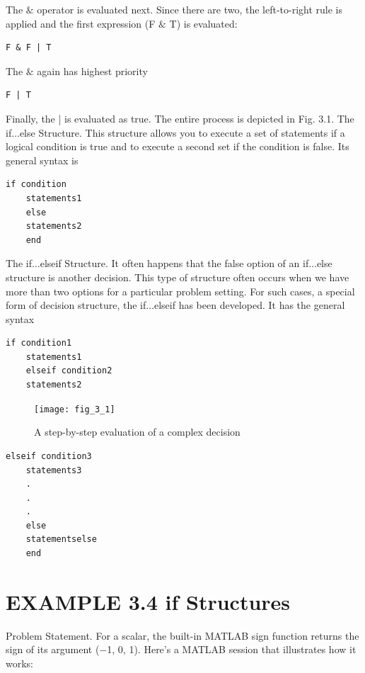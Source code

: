 \documentclass[../main.tex]{subfiles}
\begin{document}
The $\&$ operator is evaluated next. Since there are two, the left-to-right rule is applied and
the first expression (F $\&$ T) is evaluated:
\begin{lstlisting}[frame=none, numbers=none]
    F & F | T
\end{lstlisting}

The $\&$ again has highest priority
\begin{lstlisting}[frame=none, numbers=none]
    F | T
\end{lstlisting}

Finally, the | is evaluated as true. The entire process is depicted in Fig. 3.1.
The if$\ldots$else Structure. This structure allows you to execute a set of statements if
a logical condition is true and to execute a second set if the condition is false. Its general
syntax is
\begin{lstlisting}[frame=none, numbers=none]
    if condition
    statements1
    else
    statements2
    end
\end{lstlisting}
The if$\ldots$elseif Structure. It often happens that the false option of an if$\ldots$else
structure is another decision. This type of structure often occurs when we have more than
two options for a particular problem setting. For such cases, a special form of decision
structure, the if$\ldots$elseif has been developed. It has the general syntax
\begin{lstlisting}[frame=none, numbers=none]
    if condition1
    statements1
    elseif condition2
    statements2
\end{lstlisting}

\begin{figure}[H]
    \centering
    \texttt{[image: fig\_3\_1]}
    \caption{A step-by-step evaluation of a complex decision}
\end{figure}

\begin{lstlisting}[frame=none, numbers=none]
    elseif condition3
    statements3
    .
    .
    .
    else
    statementselse
    end
\end{lstlisting}

\section*{EXAMPLE 3.4 if Structures}

Problem Statement. For a scalar, the built-in MATLAB sign function returns the sign
of its argument (−1, 0, 1). Here’s a MATLAB session that illustrates how it works:
\end{document}
